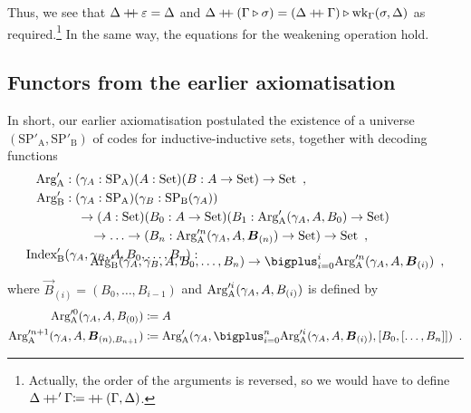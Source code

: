 \documentclass[orivec,envcountsame, ,envcountsect]{llncs}
\begin{document}
Thus, we see that $\Delta \mathbin{+\mkern-6mu+} \varepsilon = \Delta$ and $\Delta
\mathbin{+\mkern-6mu+} (\Gamma \triangleright \sigma) = (\Delta
  \mathbin{+\mkern-6mu+} \Gamma) \triangleright \text{wk}_{\Gamma}(\sigma, \Delta)$ as
required.\footnote{Actually, the order of the arguments is reversed,
  so we would have to define \\$\Delta \mathbin{+\mkern-6mu+}' \Gamma {\coloneqq}
  \mathbin{+\mkern-6mu+}(\Gamma, \Delta)$.} In the same way, the equations for
the weakening operation hold.


\subsection{Functors from the earlier axiomatisation} %
\label{sec:functors-CSL-article}

In short, our earlier
axiomatisation\cite{nordvallforsbergSetzer2010indind} postulated the
existence of a universe $(\text{SP}'_{\text{A}}, \text{SP}'_{\text{B}})$
of codes for inductive-inductive sets, together with decoding
functions 
\begin{align*}
\CSLArgA &: (\gamma_A : \text{SP}_{\text{A}})(A : \Set)(B : A \to \Set) \to \Set \enspace ,\\
\CSLArgB &: (\gamma_A : \text{SP}_{\text{A}})(\gamma_B : \text{SP}_{\text{B}}(\gamma_A)) \\
       & \quad \to (A : \Set)(B_0 : A \to \Set)(B_1 : \CSLArgA(\gamma_A, A, B_0) \to \Set) \\
       & \qquad \to \ldots \to (B_n : \CSLArgA^n(\gamma_A, A, \vec{B}_{(n)}) \to \Set) \to \Set \enspace , \\
\CSLIndex&(\gamma_A, \gamma_B, A, B_0, \ldots, B_n) : \\ \noalign{\vskip -4mm}
              &  \qquad \CSLArgB(\gamma_A, \gamma_B, A, B_0, \ldots, B_n) \to \bigplus_{i = 0}^i \CSLArgA^n(\gamma_A, A, \vec{B}_{(i)}) \enspace ,
\end{align*} 
where $\vec{B}_{(i)} = (B_0, \ldots, B_{i - 1})$ and $\text{Arg}_{\text{A}}'^i(\gamma_A, A, B_{(i)})$ is defined by
\begin{align*}
  \CSLArgA^0(\gamma_A, A, B_{(0)}) &\coloneqq A \\
  \CSLArgA^{n + 1}(\gamma_A, A, \vec{B}_{(n), B_{n + 1}}) &\coloneqq \CSLArgA(\gamma_A, \bigplus_{i = 0}^n \CSLArgA^i(\gamma_A, A, \vec{B}_{(i)}), \coprodmorph{B_0}{\coprodmorph{\ldots}{B_n}}) \enspace .
\end{align*}
\end{document}
